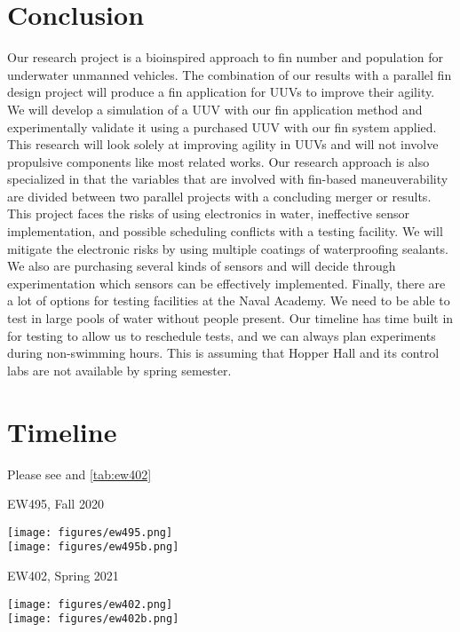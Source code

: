\documentclass{IEEEtran}
\begin{document}
\section{Conclusion}
Our research project is a bioinspired approach to fin number and population for underwater unmanned vehicles. The combination of our results with a parallel fin design project will produce a fin application for UUVs to improve their agility. We will develop a simulation of a UUV with our fin application method and experimentally validate it using a purchased UUV with our fin system applied. This research will look solely at improving agility in UUVs and will not involve propulsive components like most related works. Our research approach is also specialized in that the variables that are involved with fin-based maneuverability are divided between two parallel projects with a concluding merger or results. This project faces the risks of using electronics in water, ineffective sensor implementation, and possible scheduling conflicts with a testing facility. We will mitigate the electronic risks by using multiple coatings of waterproofing sealants. We also are purchasing several kinds of sensors and will decide through experimentation which sensors can be effectively implemented. Finally, there are a lot of options for testing facilities at the Naval Academy. We need to be able to test in large pools of water without people present. Our timeline has time built in for testing to allow us to reschedule tests, and we can always plan experiments during non-swimming hours. This is assuming that Hopper Hall and its control labs are not available by spring semester.

\nocite{xu2007initial, tangorra2006biorobotic, su2010experimental, geder2013maneuvering, zhou2009dynamics}


\appendices
\section{Timeline}
\label{app:A}
Please see  and \ref{tab:ew402}

\begin{table*}[p]
\caption{EW495, Fall 2020}
\label{tab:ew495}
\begin{center}
\texttt{[image: figures/ew495.png]}\\
\texttt{[image: figures/ew495b.png]}
\end{center}
\end{table*}

\begin{table*}[p]
\caption{EW402, Spring 2021}
\label{tab:ew402}
\begin{center}
\texttt{[image: figures/ew402.png]}\\
\texttt{[image: figures/ew402b.png]}
\end{center}
\end{table*}
\end{document}
